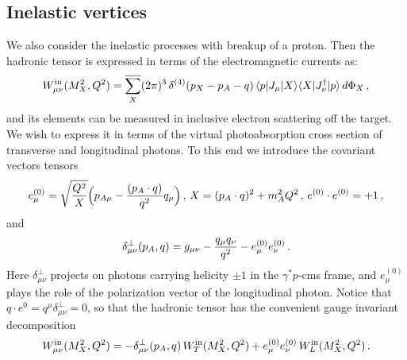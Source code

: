 
\subsection{Inelastic vertices}

We also consider the inelastic processes with breakup of a proton. 
Then the hadronic tensor is expressed in terms of the electromagnetic currents as:
\begin{eqnarray}
 W^{\rm{in}}_{\mu \nu}(M_X^2,Q^2) = \overline{\sum_X} (2 \pi)^3 \, \delta^{(4)} (p_X - p_A - q) \, \langle {p} | J_\mu | {X} \rangle\langle {X} | J_\nu^\dagger | {p} \rangle \, d\Phi_X \, ,
\label{eq:Wmunu}
\end{eqnarray}
and its elements can be measured in inclusive electron scattering 
off the target. We wish to express it in terms of the virtual photoabsorption cross section
of transverse and longitudinal photons. To this end we introduce the covariant vectors tensors
\begin{eqnarray}
e_\mu^{(0)} = \sqrt{Q^2 \over  X} \Big( p_{A\mu} - { (p_A \cdot q ) \over q^2} q_\mu \Big) \, , \, 
X = (p_A \cdot q)^2 + m_A^2 Q^2 \, , \, e^{(0)}\cdot e^{(0)} = + 1 \, ,
\end{eqnarray}
and
\begin{eqnarray}
\delta^\perp_{\mu \nu}(p_A,q) = g_{\mu \nu} - {q_\mu q_\nu \over q^2} - e^{(0)}_\mu e^{(0)}_\nu \, .
\end{eqnarray}
Here $\delta^\perp_{\mu\nu}$ projects on photons carrying helicity $\pm 1$ in the $\gamma^* p$-cms frame,
and $e_\mu^{(0)}$ plays the role of the polarization vector of the longitudinal photon.
Notice that $q\cdot e^{0} = q^\mu \delta^\perp_{\mu \nu} = 0$, so that the hadronic tensor has the convenient
gauge invariant decomposition
\begin{eqnarray}
  W^{\rm{in}}_{\mu \nu}(M_X^2,Q^2) = - \delta^\perp_{\mu \nu} (p_A,q) \, W^{\rm{in}}_T(M_X^2, Q^2) + e^{(0)}_\mu e^{(0)}_\nu \, W^{\rm{in}}_L(M_X^2, Q^2) \, .
\end{eqnarray}
